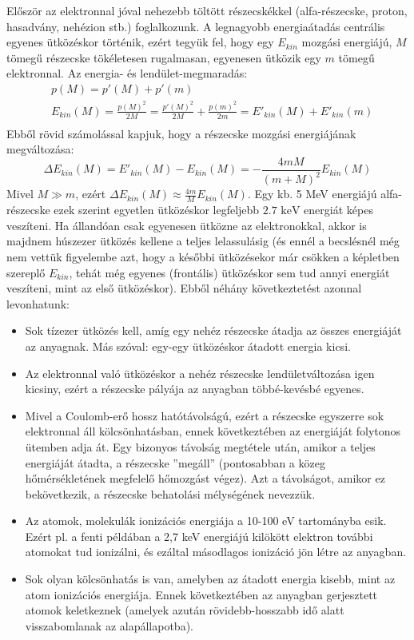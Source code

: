 \documentclass[../main.tex]{subfiles}
\begin{document}
Először az elektronnal jóval nehezebb töltött részecskékkel (alfa-részecske, proton, hasadvány, nehézion stb.) foglalkozunk. A legnagyobb energiaátadás centrális egyenes ütközéskor történik,
ezért tegyük fel, hogy egy $E_{kin}$ mozgási energiájú, $M$ tömegű részecske
tökéletesen rugalmasan, egyenesen ütközik egy $m$ tömegű elektronnal. Az energia- és
lendület-megmaradás:
\begin{equation}
    \begin{aligned}
        &p(M) = p'(M) + p'(m) \\
        &E_{kin}(M) = \frac{p(M)^2}{2M} = \frac{p'(M)^2}{2M} + \frac{p(m)^2}{2m} = E'_{kin}(M) + E'_{kin}(m) \\
    \end{aligned}
\end{equation}
Ebből rövid számolással kapjuk, hogy a részecske mozgási energiájának megváltozása:
\begin{equation}
    \Delta E_{kin}(M) = E'_{kin}(M) - E_{kin}(M) = -\frac{4 m M}{(m+M)^2} E_{kin}(M)
\end{equation}
Mivel $M \gg m$, ezért $\Delta E_{kin}(M) \approx \frac{4m}{M} E_{kin}(M)$. Egy kb. 5 MeV energiájú alfa-részecske ezek
szerint egyetlen ütközéskor legfeljebb $2.7 \text{ keV}$ energiát képes veszíteni. Ha állandóan csak
egyenesen ütközne az elektronokkal, akkor is majdnem húszezer ütközés kellene a teljes
lelassulásig (és ennél a becslésnél még nem vettük figyelembe azt, hogy a későbbi ütközésekor
már csökken a képletben szereplő $E_{kin}$, tehát még egyenes (frontális) ütközéskor
sem tud annyi energiát veszíteni, mint az első ütközéskor). Ebből néhány következtetést
azonnal levonhatunk:
\begin{itemize}
    \item Sok tízezer ütközés kell, amíg egy nehéz részecske átadja az összes energiáját az anyagnak. Más szóval: egy-egy ütközéskor átadott energia kicsi.
    \item Az elektronnal való ütközéskor a nehéz részecske lendületváltozása igen kicsiny, ezért a részecske pályája az anyagban többé-kevésbé egyenes.
    \item Mivel a Coulomb-erő hossz hatótávolságú, ezért a részecske egyszerre sok elektronnal áll kölcsönhatásban, ennek következtében az energiáját folytonos ütemben adja át. Egy bizonyos távolság megtétele után, amikor a teljes energiáját átadta, a részecske ”megáll” (pontosabban a közeg hőmérsékletének megfelelő hőmozgást végez). Azt a távolságot, amikor ez bekövetkezik, a részecske behatolási mélységének nevezzük.
    \item Az atomok, molekulák ionizációs energiája a 10-100 eV tartományba esik. Ezért pl. a fenti példában a 2,7 keV energiájú kilökött elektron további atomokat tud ionizálni, és ezáltal másodlagos ionizáció jön létre az anyagban.
    \item Sok olyan kölcsönhatás is van, amelyben az átadott energia kisebb, mint az atom ionizációs energiája. Ennek következtében az anyagban gerjesztett atomok keletkeznek (amelyek azután rövidebb-hosszabb idő alatt visszabomlanak az alapállapotba).
\end{itemize}
\end{document}
